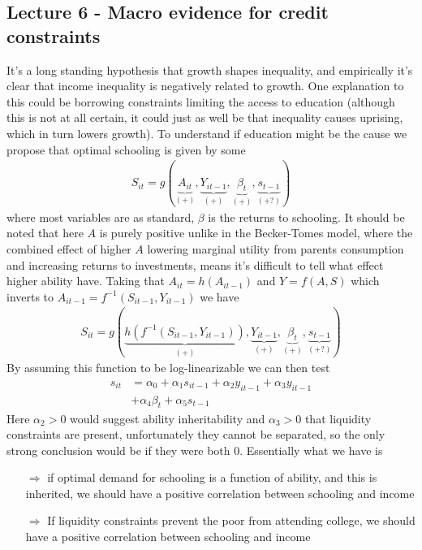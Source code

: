 \documentclass[12pt, a4paper]{article}
\begin{document}
\begin{multicols}{2}
\subsection{Lecture 6 - Macro evidence for credit constraints}
It's a long standing hypothesis that growth shapes inequality, and empirically it's clear that income inequality is negatively related to growth. One explanation to this could be borrowing constraints limiting the access to education (although this is not at all certain, it could just as well be that inequality causes uprising, which in turn lowers growth). To understand if education might be the cause we propose that optimal schooling is given by some
\begin{align*}
S_{it}=g(\underbrace{A_{it}}_{(+)}, \underbrace{Y_{it-1}}_{(+)}, \underbrace{\beta_{t}}_{(+)}, \underbrace{s_{t-1}}_{(+?)})
\end{align*}
where most variables are as standard, $\beta$ is the returns to schooling. It should be noted that here $A$ is purely positive unlike in the Becker-Tomes model, where the combined effect of higher $A$ lowering marginal utility from parents consumption and increasing returns to investments, means it's difficult to tell what effect higher ability have. Taking that $A_{it}=h(A_{it-1})$ and $Y=f(A,S)$ which inverts to $A_{it-1}= f^{-1}(S_{it-1}, Y_{it-1})$ we have
\begin{align*}
S_{it}=g(\underbrace{h(f^{-1}(S_{it-1}, Y_{it-1})) }_{(+)}, \underbrace{Y_{it-1}}_{(+)}, \underbrace{\beta_{t}}_{(+)}, \underbrace{s_{t-1}}_{(+?)})
\end{align*}
By assuming this function to be log-linearizable we can then test 
\begin{align*}
s_{it} &= \alpha_0 + \alpha_1 s_{it-1} + \alpha_2 y_{it-1} + \alpha_3 y_{it-1} \\
& + \alpha_4 \beta_t + \alpha_5 s_{t-1}
\end{align*}
Here $\alpha_2>0$ would suggest ability inheritability and $\alpha_3>0$ that liquidity constraints are present, unfortunately they cannot be separated, so the only strong conclusion would be if they were both 0. Essentially what we have is 
\begin{itemize}
\item[$\Rightarrow$] if optimal demand for schooling is a function of ability, and this is inherited, we should have a positive correlation between schooling and income
\item[$\Rightarrow$] If liquidity constraints prevent the poor from attending college, we should have a positive correlation between schooling and income

\end{itemize}
\end{multicols}
\end{document}
